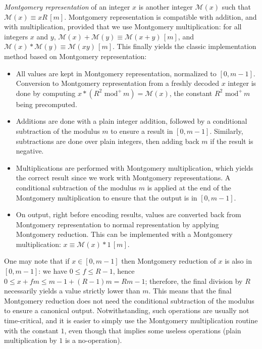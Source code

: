 \documentclass{llncs}
\newcommand{\eqvm}[3]{#1 \equiv #2 \,[#3]}
\newcommand{\umod}[2]{#1 \,\,\text{mod}^{+}\, #2}
\newcommand{\mont}[1]{\mathcal{M}(#1)}
\begin{document}
\emph{Montgomery representation} of an integer $x$ is another integer
$\mont{x}$ such that $\eqvm{\mont{x}}{xR}{m}$. Montgomery representation
is compatible with addition, and with multiplication, provided that we
use Montgomery multiplication: for all integers $x$ and $y$,
$\eqvm{\mont{x} + \mont{y}}{\mont{x + y}}{m}$, and
$\eqvm{\mont{x} * \mont{y}}{\mont{xy}}{m}$. This finally yields the
classic implementation method based on Montgomery representation:
\begin{itemize}

    \item All values are kept in Montgomery representation, normalized
    to $[0, m-1]$. Conversion to Montgomery representation from a freshly
    decoded $x$ integer is done by computing
    $x * (\umod{R^2}{m}) = \mont{x}$, the constant $\umod{R^2}{m}$ being
    precomputed.

    \item Additions are done with a plain integer addition, followed by
    a conditional subtraction of the modulus $m$ to ensure a result in
    $[0, m-1]$. Similarly, subtractions are done over plain integers, then
    adding back $m$ if the result is negative.

    \item Multiplications are performed with Montgomery multiplication,
    which yields the correct result since we work with Montgomery
    representations. A conditional subtraction of the modulus $m$ is
    applied at the end of the Montgomery multiplication to ensure that
    the output is in $[0, m-1]$.

    \item On output, right before encoding results, values are converted
    back from Montgomery representation to normal representation by
    applying Montgomery reduction. This can be implemented with a
    Montgomery multiplication: $\eqvm{x}{\mont{x} * 1}{m}$.

\end{itemize}
One may note that if $x\in [0, m-1]$ then Montgomery reduction of $x$ is
also in $[0, m-1]$: we have $0\leq f\leq R-1$, hence $0\leq x + fm\leq m
- 1 + (R - 1)m = Rm - 1$; therefore, the final division by $R$
necessarily yields a value strictly lower than $m$. This means that the
final Montgomery reduction does not need the conditional subtraction of
the modulus to ensure a canonical output. Notwithstanding, such
operations are usually not time-critical, and it is easier to simply use
the Montgomery multiplication routine with the constant $1$, even though
that implies some useless operations (plain multiplication by $1$ is a
no-operation).
\end{document}
